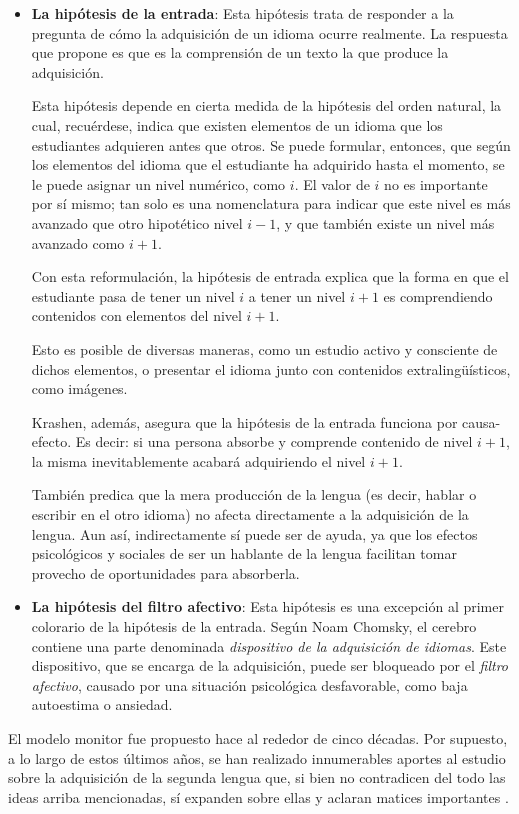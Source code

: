 \begin{itemize}
	\item \textbf{La hipótesis de la entrada}: Esta hipótesis trata de responder a la pregunta de cómo la adquisición de un idioma ocurre realmente. La respuesta que propone es que es la comprensión de un texto la que produce la adquisición.
	
	Esta hipótesis depende en cierta medida de la hipótesis del orden natural, la cual, recuérdese, indica que existen elementos de un idioma que los estudiantes adquieren antes que otros. Se puede formular, entonces, que según los elementos del idioma que el estudiante ha adquirido hasta el momento, se le puede asignar un nivel numérico, como $i$. El valor de $i$ no es importante por sí mismo; tan solo es una nomenclatura para indicar que este nivel es más avanzado que otro hipotético nivel $i - 1$, y que también existe un nivel más avanzado como $i + 1$.
	
	Con esta reformulación, la hipótesis de entrada explica que la forma en que el estudiante pasa de tener un nivel $i$ a tener un nivel $i + 1$ es comprendiendo contenidos con elementos del nivel $i + 1$.
	
	Esto es posible de diversas maneras, como un estudio activo y consciente de dichos elementos, o presentar el idioma junto con contenidos extralingüísticos, como imágenes.
	
	Krashen, además, asegura que la hipótesis de la entrada funciona por causa-efecto. Es decir: si una persona absorbe y comprende contenido de nivel $i + 1$, la misma inevitablemente acabará adquiriendo el nivel $i + 1$.
	
	También predica que la mera producción de la lengua (es decir, hablar o escribir en el otro idioma) no afecta directamente a la adquisición de la lengua. Aun así, indirectamente sí puede ser de ayuda, ya que los efectos psicológicos y sociales de ser un hablante de la lengua facilitan tomar provecho de oportunidades para absorberla.
	
	\item \textbf{La hipótesis del filtro afectivo}: Esta hipótesis es una excepción al primer colorario de la hipótesis de la entrada. Según Noam Chomsky, el cerebro contiene una parte denominada \textit{dispositivo de la adquisición de idiomas}. Este dispositivo, que se encarga de la adquisición, puede ser bloqueado por el \textit{filtro afectivo}, causado por una situación psicológica desfavorable, como baja autoestima o ansiedad.
\end{itemize}

El modelo monitor fue propuesto hace al rededor de cinco décadas. Por supuesto, a lo largo de estos últimos años, se han realizado innumerables aportes al estudio sobre la adquisición de la segunda lengua que, si bien no contradicen del todo las ideas arriba mencionadas, sí expanden sobre ellas y aclaran matices importantes \autocite{https://doi.org/10.1111/flan.12552}. \todo[¿Cuáles?]

